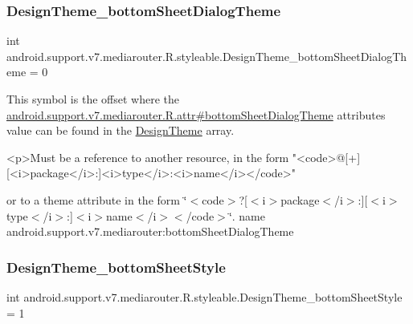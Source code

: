 \subsubsection{\texorpdfstring{Design\+Theme\+\_\+bottom\+Sheet\+Dialog\+Theme}{DesignTheme\_bottomSheetDialogTheme}}
{\footnotesize\ttfamily int android.\+support.\+v7.\+mediarouter.\+R.\+styleable.\+Design\+Theme\+\_\+bottom\+Sheet\+Dialog\+Theme = 0\hspace{0.3cm}{\ttfamily [static]}}

This symbol is the offset where the \hyperlink{classandroid_1_1support_1_1v7_1_1mediarouter_1_1R_1_1attr_a3a70ecd8e55ca333f24980174223ca54}{android.\+support.\+v7.\+mediarouter.\+R.\+attr\#bottom\+Sheet\+Dialog\+Theme} attribute\textquotesingle{}s value can be found in the \hyperlink{classandroid_1_1support_1_1v7_1_1mediarouter_1_1R_1_1styleable_acb06effd66e79840e1295f063dfa8f82}{Design\+Theme} array.

\begin{DoxyVerb}      <p>Must be a reference to another resource, in the form "<code>@[+][<i>package</i>:]<i>type</i>:<i>name</i></code>"
\end{DoxyVerb}
 or to a theme attribute in the form \char`\"{}$<$code$>$?\mbox{[}$<$i$>$package$<$/i$>$\+:\mbox{]}\mbox{[}$<$i$>$type$<$/i$>$\+:\mbox{]}$<$i$>$name$<$/i$>$$<$/code$>$\char`\"{}.  name android.\+support.\+v7.\+mediarouter\+:bottom\+Sheet\+Dialog\+Theme \mbox{\label{classandroid_1_1support_1_1v7_1_1mediarouter_1_1R_1_1styleable_a6056eb777548f236d844db615fe3ad4a}} 
\subsubsection{\texorpdfstring{Design\+Theme\+\_\+bottom\+Sheet\+Style}{DesignTheme\_bottomSheetStyle}}
{\footnotesize\ttfamily int android.\+support.\+v7.\+mediarouter.\+R.\+styleable.\+Design\+Theme\+\_\+bottom\+Sheet\+Style = 1\hspace{0.3cm}{\ttfamily [static]}}


